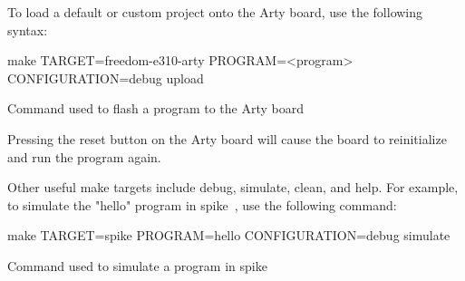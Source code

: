 To load a default or custom project onto the Arty board, use the following syntax:

\begin{listing}[h!tbp]
  \begin{bashsource}
    make TARGET=freedom-e310-arty PROGRAM=<program> CONFIGURATION=debug upload
  \end{bashsource}
  \caption{Command used to flash a program to the Arty board}
  \label{lst:upload_to_arty}
\end{listing}

Pressing the reset button on the Arty board will cause the board to reinitialize and run the program again.

Other useful make targets include debug, simulate, clean, and help.
For example, to simulate the "hello" program in \gls{spike}~\cite{SpikeSimulator}, use the following command:

\begin{listing}[h!tbp]
  \begin{bashsource}
    make TARGET=spike PROGRAM=hello CONFIGURATION=debug simulate
  \end{bashsource}
  \caption{Command used to simulate a program in \gls{spike}}
  \label{lst:simulate_in_spike}
\end{listing}


